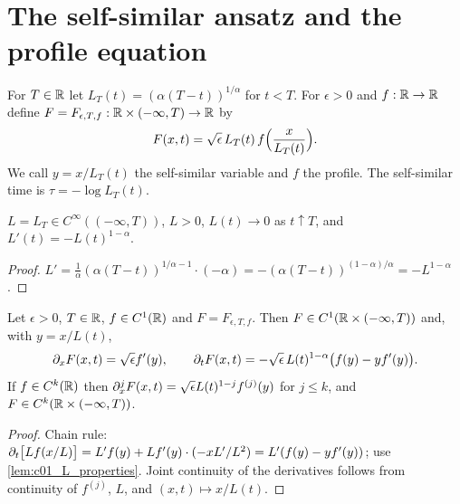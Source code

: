 \section{The self-similar ansatz and the profile equation}

\begin{definition}
  \label{def:self_similar_ansatz}
  For $T\in\mathbb{R}$ let $L_T(t)=(\alpha(T-t))^{1/\alpha}$ for $t<T$.  For $\epsilon>0$ and
  $f:\mathbb{R}\to\mathbb{R}$ define $F=F_{\epsilon,T,f}:\mathbb{R}\times(-\infty,T)\to\mathbb{R}$ by
  \begin{equation}\label{eqn:intro_self_similar_ansatz}
    F(x,t)=\sqrt\epsilon\,L_T(t)\,f\Bigl(\frac{x}{L_T(t)}\Bigr).
  \end{equation}
  We call $y=x/L_T(t)$ the self-similar variable and $f$ the profile.  The self-similar time is
  $\tau=-\log L_T(t)$.
\end{definition}

\begin{lemma}[Properties of $L$]
  \label{lem:c01_L_properties}
  $L=L_T\in C^\infty((-\infty,T))$, $L>0$, $L(t)\to0$ as $t\uparrow T$, and $L'(t)=-L(t)^{1-\alpha}$.
\end{lemma}
\begin{proof}
  $L'=\frac1\alpha(\alpha(T-t))^{1/\alpha-1}\cdot(-\alpha)=-(\alpha(T-t))^{(1-\alpha)/\alpha}=-L^{1-\alpha}$.
\end{proof}

\begin{lemma}
  \label{lem:c01_ansatz_time_derivative}
  Let $\epsilon>0$, $T\in\mathbb{R}$, $f\in C^1(\mathbb{R})$ and $F=F_{\epsilon,T,f}$.  Then $F\in C^1(\mathbb{R}\times(-\infty,T))$ and, with $y=x/L(t)$,
  \[
    \partial_xF(x,t)=\sqrt\epsilon f'(y),\qquad
    \partial_tF(x,t)=-\sqrt\epsilon\,L(t)^{1-\alpha}\bigl(f(y)-yf'(y)\bigr).
  \]
  If $f\in C^k(\mathbb{R})$ then $\partial_x^jF(x,t)=\sqrt\epsilon L(t)^{1-j}f^{(j)}(y)$ for $j\le k$, and
  $F\in C^k(\mathbb{R}\times(-\infty,T))$.
\end{lemma}
\begin{proof}
  Chain rule: $\partial_t\bigl[L f(x/L)\bigr]=L'f(y)+Lf'(y)\cdot(-xL'/L^2)=L'(f(y)-yf'(y))$; use
  \cref{lem:c01_L_properties}.  Joint continuity of the derivatives follows from continuity of
  $f^{(j)}$, $L$, and $(x,t)\mapsto x/L(t)$.
\end{proof}

